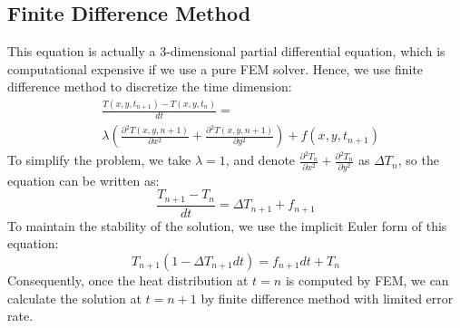 \documentclass[conference]{IEEEtran}
\begin{document}
    \subsection{Finite Difference Method}
    This equation is actually a 3-dimensional partial differential equation, which is computational 
    expensive if we use a pure FEM solver. Hence, we use finite difference method to discretize
    the time dimension:
    \begin{align}\nonumber
        & \frac{T(x,y, t_{n+1}) - T(x, y, t_{n})}{dt} =\\
        \nonumber& \lambda(\frac{\partial {^2 T(x, y, n+1)}}{\partial{x^2}} + \frac{\partial {^2 T(x, y, n+1)}}{\partial{y^2}}) + f(x, y, t_{n+1})
    \end{align}
    To simplify the problem, we take $\lambda = 1$, and denote $\frac{\partial {^2 T_n}}{\partial{x^2}} + \frac{\partial {^2 T_n}}{\partial{y^2}}$ 
    as $\Delta T_n$, so the equation can be written as:
    $$\frac{T_{n+1} - T_{n}}{dt} = \Delta T_{n+1} + f_{n+1}$$
    To maintain the stability of the solution, we use the implicit Euler form of this equation:
    $$T_{n+1}(1 - \Delta T_{n+1} dt) = f_{n+1}dt + T_{n}$$
    Consequently, once the heat distribution at $t = n$ is computed by FEM, we can calculate the solution at $t = n + 1$
    by finite difference method with limited error rate.
\end{document}
